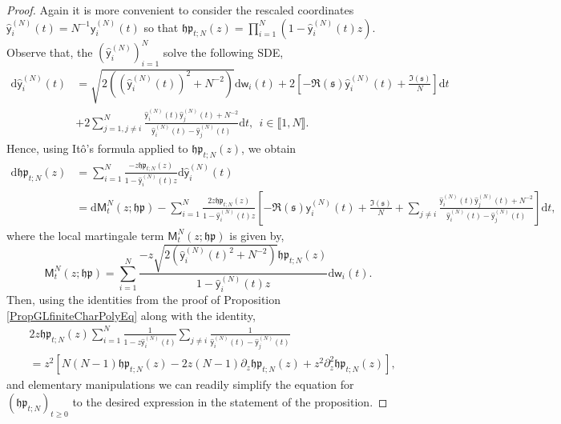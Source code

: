 \documentclass[]{article}
\begin{document}
\begin{proof}
Again it is more convenient to consider the rescaled coordinates $\hat{\mathsf{y}}_i^{(N)}(t)=N^{-1}\mathsf{y}_i^{(N)}(t)$ so that $\mathfrak{hp}_{t;N}(z)=\prod_{i=1}^N(1-\hat{\mathsf{y}}_i^{(N)}(t)z)$. Observe that, the $(\hat{\mathsf{y}}_i^{(N)})_{i=1}^N$ solve the  following SDE,
\begin{align}\label{Hua-Pickrell}
\mathrm{d}\hat{\mathsf{y}}_i^{(N)}(t)&=\sqrt{2\left((\hat{\mathsf{y}}_i^{(N)}(t))^2+N^{-2}\right)}\mathrm{d}\mathsf{w}_i(t)+2\left[-\Re{(\mathfrak{s})}\hat{\mathsf{y}}_i^{(N)}(t)+\frac{\Im(\mathfrak{s})}{N}\right]\mathrm{d}t\nonumber\\
&+2\sum_{j=1,j\neq i}^N \frac{\hat{\mathsf{y}}_i^{(N)}(t)\hat{\mathsf{y}}_j^{(N)}(t)+N^{-2}}{\hat{\mathsf{y}}_i^{(N)}(t)-\hat{\mathsf{y}}_j^{(N)}(t)}\mathrm{d}t, \ \ i\in \llbracket 1, N \rrbracket.
\end{align}
Hence, using It\^{o}'s formula applied to $\mathfrak{hp}_{t;N}(z)$, we obtain 
\begin{align*}
    \mathrm{d}\mathfrak{hp}_{t;N}(z)
    &=
    \sum_{i=1}^N\frac{-z\mathfrak{hp}_{t;N}(z)}{1-\hat{\mathsf{y}}_i^{(N)}(t)z}\mathrm{d}\hat{\mathsf{y}}_i^{(N)}(t)
    \\
    &=
	\mathrm{d}\mathsf{M}_t^N(z;\mathfrak{hp})
-\sum_{i=1}^N\frac{2z\mathfrak{hp}_{t;N}(z)}{1-\hat{\mathsf{y}}_i^{(N)}(t)z}
\left[-\Re{(\mathfrak{s})}\hat{\mathsf{y}}_i^{(N)}(t)+\frac{\Im{(\mathfrak{s})}}{N}+\sum_{j\neq i}\frac{\hat{\mathsf{y}}_i^{(N)}(t)\hat{\mathsf{y}}_j^{(N)}(t)+N^{-2}}{\hat{\mathsf{y}}_i^{(N)}(t)-\hat{\mathsf{y}}_j^{(N)}(t)}\right]\mathrm{d}t,
\end{align*}
where the local martingale term $\mathsf{M}_t^{N}(z;\mathfrak{hp})$ is given by,
\begin{equation*}
\mathsf{M}_t^{N}(z;\mathfrak{hp})=
\sum_{i=1}^N\frac{-z\sqrt{2\left(\hat{\mathsf{y}}_i^{(N)}(t)^2+N^{-2}\right)}\mathfrak{hp}_{t;N}(z)}{1-\hat{\mathsf{y}}_i^{(N)}(t)z}\mathrm{d}\mathsf{w}_i(t).
\end{equation*}
Then, using  the identities from the proof of Proposition \ref{PropGLfiniteCharPolyEq} along with the identity,
\begin{align*}
&2z\mathfrak{hp}_{t;N}(z)\sum_{i=1}^N\frac{1}{1-z\hat{\mathsf{y}}_i^{(N)}(t)}\sum_{j\neq i}\frac{1}{\hat{\mathsf{y}}_i^{(N)}(t)-\hat{\mathsf{y}}_j^{(N)}(t)}\\&=z^2\left[N(N-1)\mathfrak{hp}_{t;N}(z)-2z(N-1)\partial_z \mathfrak{hp}_{t;N}(z)+z^2\partial_z^2\mathfrak{hp}_{t;N}(z)\right],
\end{align*}
and elementary manipulations we can readily simplify the equation for $(\mathfrak{hp}_{t;N})_{t\ge 0}$ to the desired expression in the statement of the proposition.
\end{proof}
\end{document}
